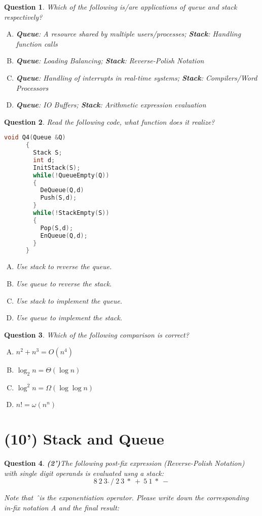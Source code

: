 \documentclass[11pt]{article}
\newtheorem{Q}{Question}
\begin{document}
\begin{Q}
	Which of the following is/are applications of queue and stack respectively?
	\begin{enumerate}[(A)]
		\item \textbf{Queue}: A resource shared by multiple users/processes; \textbf{Stack}: Handling function calls
		\item \textbf{Queue}: Loading Balancing; \textbf{Stack}: Reverse-Polish Notation
		\item \textbf{Queue}: Handling of interrupts in real-time systems; \textbf{Stack}: Compilers/Word Processors
		\item \textbf{Queue}: IO Buffers; \textbf{Stack}: Arithmetic expression evaluation
	\end{enumerate}
\end{Q}



\begin{Q}
	Read the following code, what function does it realize? \\
	\begin{lstlisting}[language=C++]
	  void Q4(Queue &Q) 
	  {
	    Stack S;
		int d;
		InitStack(S);
		while(!QueueEmpty(Q))
		{
		  DeQueue(Q,d)
		  Push(S,d);
		}
		while(!StackEmpty(S))
		{
		  Pop(S,d);
		  EnQueue(Q,d);
		}
	  }
	\end{lstlisting}
	\begin{enumerate}[(A)]
		\item Use stack to reverse the queue.
		\item Use queue to reverse the stack.
		\item Use stack to implement the queue.
		\item Use queue to implement the stack.
	\end{enumerate}
\end{Q}



\begin{Q}
	Which of the following comparison is correct?  
	\begin{enumerate}[(A)]
		\item $n^2 + n^3 = O(n^4)$
		\item  $\log_2 n = \Theta(\log n)$
		\item  $\log^2 n = \Omega(\log\log n)$
		\item $n! = \omega(n^n)$
	\end{enumerate}
\end{Q}


\section{(10') Stack and Queue}
\begin{Q}
\textbf{(2')}The following post-fix expression (Reverse-Polish Notation) with single digit operands is evaluated usng a stack:\\
$$8\ 2\ 3\ \hat\ /\ 2\ 3\ *\ +\ 5\ 1\ *\ - $$

Note that \^\ is the exponentiation operator. Please write down the corresponding in-fix notation A and the final result:\\
\vspace{0.5in}
\end{Q}
\end{document}
